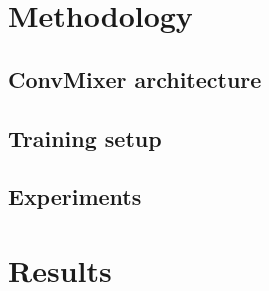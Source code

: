 \documentclass[letterpaper]{article} %
\begin{document}
\section{Methodology}

\subsection{ConvMixer architecture}

\subsection{Training setup}

\subsection{Experiments}

\section{Results}

\appendix


\end{document}
